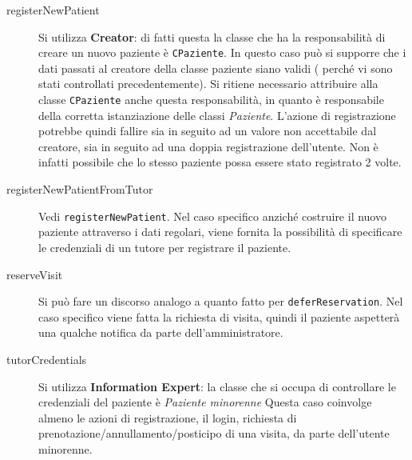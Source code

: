 \begin{description}
\item[registerNewPatient]

Si utilizza \textbf{Creator}: di fatti questa la classe che ha la responsabilità 
di creare un nuovo paziente è \texttt{CPaziente}.
In questo caso può si supporre che i dati passati al creatore della classe 
paziente siano validi ( perché vi sono stati controllati precedentemente). 
Si ritiene necessario attribuire alla classe \texttt{CPaziente} anche questa
 responsabilità, in quanto è responsabile della corretta istanziazione delle 
 classi \textit{Paziente}. L'azione di registrazione potrebbe quindi fallire sia in 
 seguito ad un valore non accettabile dal creatore, sia in seguito ad una doppia
 registrazione dell'utente. Non è infatti possibile che lo stesso paziente possa
 essere stato registrato 2 volte.

\item[registerNewPatientFromTutor]

Vedi \texttt{registerNewPatient}. Nel caso specifico anziché costruire il nuovo 
paziente attraverso i dati regolari, viene fornita la possibilità di specificare 
le credenziali di un tutore per registrare il paziente.

\item[reserveVisit]

Si può fare un discorso analogo a quanto fatto per \texttt{deferReservation}. Nel 
caso specifico viene fatta la richiesta di visita, quindi il paziente aspetterà 
una qualche notifica da parte dell'amministratore.

\item[tutorCredentials]

Si utilizza \textbf{Information Expert}: la classe che si occupa di controllare le 
credenziali del paziente è \textit{Paziente minorenne}
Questa caso coinvolge almeno le azioni di registrazione, il login, richiesta di 
prenotazione/annullamento/posticipo di una visita, da parte dell'utente minorenne.


\end{description}


